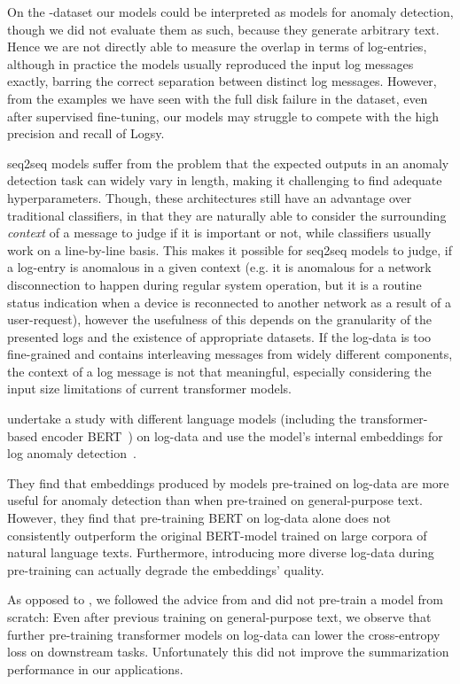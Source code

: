 On the \hadoop{}-dataset our models could be interpreted as models for anomaly detection,
though we did not evaluate them as such, because they generate arbitrary text.
Hence we are not directly able to measure the overlap in terms of log-entries,
although in practice the models usually reproduced the input log messages exactly,
barring the correct separation between distinct log messages.
However, from the examples we have seen with the full disk failure in the \hadoop{} dataset,
even after supervised fine-tuning, our models may struggle to compete with the high precision and recall of Logsy.

\Ac{seq2seq} models suffer from the problem that the expected outputs in an anomaly detection task can widely vary in length,
making it challenging to find adequate hyperparameters.
Though, these architectures still have an advantage over traditional classifiers,
in that they are naturally able to consider the surrounding \emph{context} of a message to judge if it is important or not,
while classifiers usually work on a line-by-line basis.
This makes it possible for \ac{seq2seq} models to judge, if a log-entry is anomalous in a given context
(e.g. it is anomalous for a network disconnection to happen during regular system operation,
but it is a routine status indication when a device is reconnected to another network as a result of a user-request),
however the usefulness of this depends on the granularity of the presented logs and the existence of appropriate datasets.
If the log-data is too fine-grained and contains interleaving messages from widely different components,
the context of a log message is not that meaningful, especially considering the input size limitations of current transformer models.

\citeauthor{language_models_logging} undertake a study with different language models
(including the transformer-based encoder BERT~\parencite{bert}) on log-data
and use the model's internal embeddings for log anomaly detection~\parencite{language_models_logging}.

They find that embeddings produced by models pre-trained on log-data are more useful for anomaly detection
than when pre-trained on general-purpose text.
However, they find that pre-training BERT on log-data alone does not consistently outperform
the original BERT-model trained on large corpora of natural language texts.
Furthermore, introducing more diverse log-data during pre-training can actually degrade the embeddings' quality.

As opposed to \citeauthor*{language_models_logging}, we followed the advice from \parencite{dont_stop_pretraining}
and did not pre-train a model from scratch:
Even after previous training on general-purpose text,
we observe that further pre-training transformer models on log-data can lower the cross-entropy loss on downstream tasks.
Unfortunately this did not improve the summarization performance in our applications.


